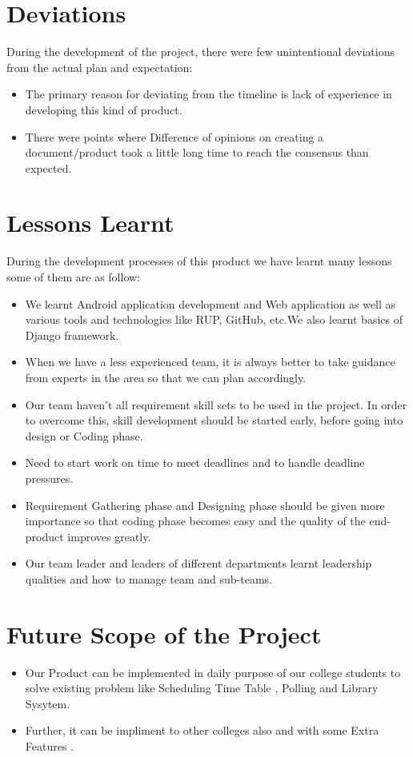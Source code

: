 \documentclass{article}
\begin{document}
\section{Deviations}
During the development of the project, there were few unintentional deviations from the actual plan and expectation:
\begin{itemize}
  \item The primary reason for deviating from the timeline is lack of experience in developing this kind of product.
  \item There were points where Difference of opinions on creating a document/product took a little long time to reach the consensus than expected.
\end{itemize}
\section{Lessons Learnt}
During the development processes of this product we have learnt many lessons some of them are as follow:
\begin{itemize}
\item We learnt Android application development and Web application as well as various tools and technologies like RUP, GitHub, etc.We also learnt basics of Django framework.
  \item When we have a less experienced team, it is always better to take guidance from experts in the area so that we can plan accordingly.
  \item Our team haven’t all requirement skill sets to be used in the project. In order to overcome this, skill development should be started early, before going into design or Coding phase.
  \item Need to start work on time to meet deadlines and to handle deadline pressures.
  \item Requirement Gathering phase and Designing phase should be given more
importance so that coding phase becomes easy and the quality of the end-product improves greatly.
\item Our team leader and leaders of different departments learnt
leadership qualities and how to manage team and sub-teams.
\end{itemize}
\section{Future Scope of the Project}

\begin{itemize}
  \item Our Product can be implemented in daily purpose of our college students to solve existing problem like Scheduling Time Table , Polling and Library Sysytem.
  \item Further, it can be impliment to other colleges also and with some Extra Features .
\end{itemize}
\end{document}
